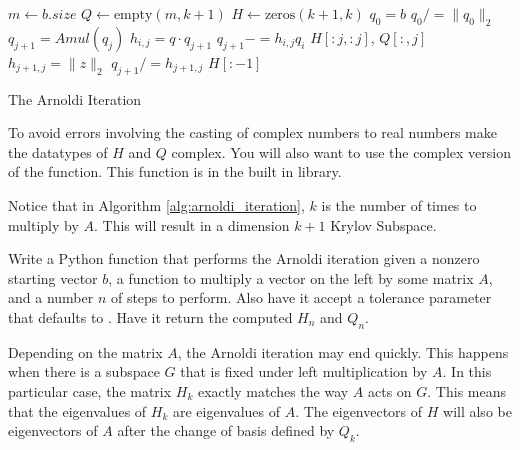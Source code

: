\begin{algorithm}
\begin{algorithmic}[1]
	\State $m \gets b.size$						
	\State $Q \gets \text{empty}\left(m, k+1\right)$
	\State $H \gets \text{zeros}\left( k+1, k\right)$
	\State $q_0 = b$							
	\State $q_0 /= \|q_0\|_2$						
								
		\State $q_{j+1} = Amul \left(q_j\right)$		
							
			\State $h_{i,j} = q \cdot q_{j+1}$		
			\State $q_{j+1} -= h_{i,j} q_i$
		\EndFor
							
			\State {} $H[:j,:j]$, $Q[:,j]$
		\EndIf
		\State $h_{j+1,j} = \|z\|_2$				
		\State $q_{j+1} /= h_{j+1,j}$				
	\EndFor
	\State {} $H[:-1]$				
\EndProcedure
\end{algorithmic}
\caption{The Arnoldi Iteration}
\label{alg:arnoldi_iteration}
\end{algorithm}

\begin{warn}
To avoid errors involving the casting of complex numbers to real numbers make the datatypes of $H$ and $Q$ complex.
You will also want to use the complex version of the  function.
This function is in the built in  library.
\end{warn}

Notice that in Algorithm \ref{alg:arnoldi_iteration}, $k$ is the number of times to multiply by $A$.
This will result in a dimension $k+1$ Krylov Subspace.

\begin{problem}
Write a Python function that performs the Arnoldi iteration given a nonzero starting vector $b$, a function to multiply a vector on the left by some matrix $A$, and a number $n$ of steps to perform.
Also have it accept a tolerance parameter that defaults to .
Have it return the computed $H_n$ and $Q_n$.
\end{problem}

\begin{info}
Depending on the matrix $A$, the Arnoldi iteration may end quickly.
This happens when there is a subspace $G$ that is fixed under left multiplication by $A$.
In this particular case, the matrix $H_k$ exactly matches the way $A$ acts on $G$.
This means that the eigenvalues of $H_k$ are eigenvalues of $A$.
The eigenvectors of $H$ will also be eigenvectors of $A$ after the change of basis defined by $Q_k$.
\end{info}


